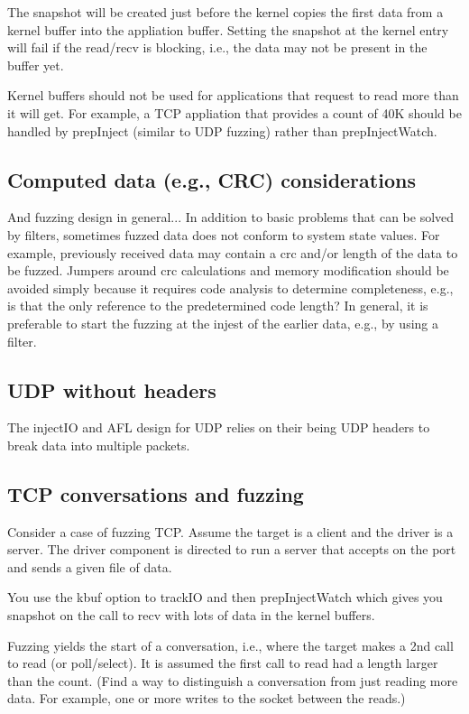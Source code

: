 \documentclass[titlepage]{article}
\begin{document}
\begin{appendices}
The snapshot will be created just before the kernel copies the first data from a kernel buffer into the appliation buffer.  Setting the snapshot at the kernel entry will fail if the read/recv
is blocking, i.e., the data may not be present in the buffer yet.

Kernel buffers should not be used for applications that request to read more than it will get.  For example, a TCP appliation that provides a count of 40K should be handled by
prepInject (similar to UDP fuzzing) rather than prepInjectWatch.

\subsection{Computed data (e.g., CRC) considerations}
And fuzzing design in general... In addition to basic problems that can be solved by filters, sometimes fuzzed data does not conform to system state values.
For example, previously received data may contain a crc and/or length of the data to be fuzzed.  Jumpers around crc calculations and memory modification should
be avoided simply because it requires code analysis to determine completeness, e.g., is that the only reference to the predetermined code length?  In general,
it is preferable to start the fuzzing at the injest of the earlier data, e.g., by using a filter.

\subsection{UDP without headers}
The injectIO and AFL design for UDP relies on their being UDP headers to break data into multiple packets.

\subsection{TCP conversations and fuzzing}
Consider a case of fuzzing TCP.  Assume the target is a client and the driver is a server.
The driver component is directed to run a server that accepts on the port and sends a given file of data.

You use the kbuf option to trackIO and then prepInjectWatch which gives you snapshot on the
call to recv with lots of data in the kernel buffers.

Fuzzing yields the start of a conversation, i.e., where the target makes a 2nd call to read (or poll/select).  It
is assumed the first call to read had a length larger than the count.  (Find a way to distinguish a conversation from
just reading more data.  For example, one or more writes to the socket between the reads.)


\end{appendices}
\end{document}
